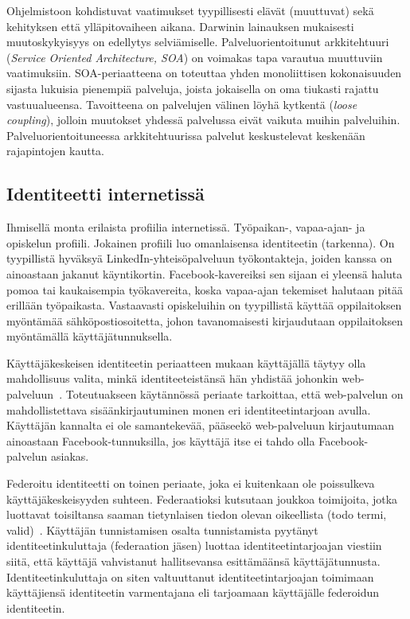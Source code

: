 \documentclass[finnish,gradu]{tktltiki}
\begin{document}
  Ohjelmistoon kohdistuvat vaatimukset tyypillisesti elävät (muuttuvat) sekä kehityksen että ylläpitovaiheen aikana. Darwinin lainauksen mukaisesti muutoskykyisyys on edellytys selviämiselle. Palveluorientoitunut arkkitehtuuri (\emph{Service Oriented Architecture, SOA}) on voimakas tapa varautua muuttuviin vaatimuksiin. SOA-periaatteena on toteuttaa yhden monoliittisen kokonaisuuden sijasta lukuisia pienempiä palveluja, joista jokaisella on oma tiukasti rajattu vastuualueensa. Tavoitteena on palvelujen välinen löyhä kytkentä (\emph{loose coupling}), jolloin muutokset yhdessä palvelussa eivät vaikuta muihin palveluihin. Palveluorientoituneessa arkkitehtuurissa palvelut keskustelevat keskenään rajapintojen kautta.




  \subsection{Identiteetti internetissä} %
  \label{sub:identiteetti_internetissä}

  Ihmisellä monta erilaista profiilia internetissä. Työpaikan-, vapaa-ajan- ja opiskelun profiili. Jokainen profiili luo omanlaisensa identiteetin (tarkenna). On tyypillistä hyväksyä LinkedIn-yhteisöpalveluun työkontakteja, joiden kanssa on ainoastaan jakanut käyntikortin. Facebook-kavereiksi sen sijaan ei yleensä haluta pomoa tai kaukaisempia työkavereita, koska vapaa-ajan tekemiset halutaan pitää erillään työpaikasta. Vastaavasti opiskeluihin on tyypillistä käyttää oppilaitoksen myöntämää sähköpostiosoitetta, johon tavanomaisesti kirjaudutaan oppilaitoksen myöntämällä käyttäjätunnuksella.

  Käyttäjäkeskeisen identiteetin periaatteen mukaan käyttäjällä täytyy olla mahdollisuus valita, minkä identiteeteistänsä hän yhdistää johonkin web-palveluun~\cite{openid_recordon_2009}. Toteutuakseen käytännössä periaate tarkoittaa, että web-palvelun on mahdollistettava sisäänkirjautuminen monen eri identiteetintarjoan avulla. Käyttäjän kannalta ei ole samantekevää, pääseekö web-palveluun kirjautumaan ainoastaan Facebook-tunnuksilla, jos käyttäjä itse ei tahdo olla Facebook-palvelun asiakas.

  Federoitu identiteetti on toinen periaate, joka ei kuitenkaan ole poissulkeva käyttäjäkeskeisyyden suhteen. Federaatioksi kutsutaan joukkoa toimijoita, jotka luottavat toisiltansa saaman tietynlaisen tiedon olevan oikeellista (todo termi, valid)~\cite{id_in_federation_systems_2005}. Käyttäjän tunnistamisen osalta tunnistamista pyytänyt identiteetinkuluttaja (federaation jäsen) luottaa identiteetintarjoajan viestiin siitä, että käyttäjä vahvistanut hallitsevansa esittämäänsä käyttäjätunnusta. Identiteetinkuluttaja on siten valtuuttanut identiteetintarjoajan toimimaan käyttäjiensä identiteetin varmentajana eli tarjoamaan käyttäjälle federoidun identiteetin.
\end{document}
